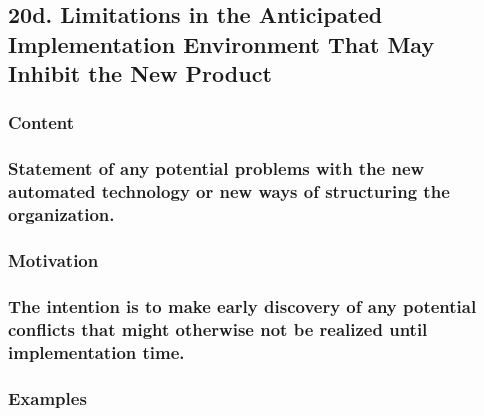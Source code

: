 \documentclass[
]{article}
\begin{document}
\hypertarget{d.-limitations-in-the-anticipated-implementation-environment-that-may-inhibit-the-new-product}{%
\subsection{20d. Limitations in the Anticipated Implementation
Environment That May Inhibit the New
Product}\label{d.-limitations-in-the-anticipated-implementation-environment-that-may-inhibit-the-new-product}}

\hypertarget{content-67}{%
\subsubsection{Content}\label{content-67}}

\hypertarget{statement-of-any-potential-problems-with-the-new-automated-technology-or-new-ways-of-structuring-the-organization.}{%
\subsubsection{Statement of any potential problems with the new
automated technology or new ways of structuring the
organization.}\label{statement-of-any-potential-problems-with-the-new-automated-technology-or-new-ways-of-structuring-the-organization.}}

\hypertarget{motivation-66}{%
\subsubsection{Motivation}\label{motivation-66}}

\hypertarget{the-intention-is-to-make-early-discovery-of-any-potential-conflicts-that-might-otherwise-not-be-realized-until-implementation-time.}{%
\subsubsection{\texorpdfstring{The intention is to make early discovery
of any potential conflicts that might otherwise not be realized until
implementation time.
}{The intention is to make early discovery of any potential conflicts that might otherwise not be realized until implementation time. }}\label{the-intention-is-to-make-early-discovery-of-any-potential-conflicts-that-might-otherwise-not-be-realized-until-implementation-time.}}

\hypertarget{examples-43}{%
\subsubsection{Examples}\label{examples-43}}
\end{document}
